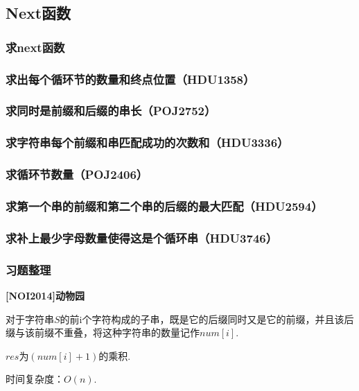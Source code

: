 \documentclass[twoside,a4paper]{article}
\begin{document}
\subsection{Next函数}

\subsubsection{求next函数}


\subsubsection{求出每个循环节的数量和终点位置（HDU1358）}


\subsubsection{求同时是前缀和后缀的串长（POJ2752）}


\subsubsection{求字符串每个前缀和串匹配成功的次数和（HDU3336）}


\subsubsection{求循环节数量（POJ2406）}


\subsubsection{求第一个串的前缀和第二个串的后缀的最大匹配（HDU2594）}


\subsubsection{求补上最少字母数量使得这是个循环串（HDU3746）}


\subsubsection{习题整理}
\textbf{[NOI2014]动物园}\par
对于字符串$S$的前i个字符构成的子串，既是它的后缀同时又是它的前缀，并且该后缀与该前缀不重叠，将这种字符串的数量记作$num[i]$.\par
$res$为$(num[i]+1)$的乘积.\par
时间复杂度：$O(n).$

\end{document}
